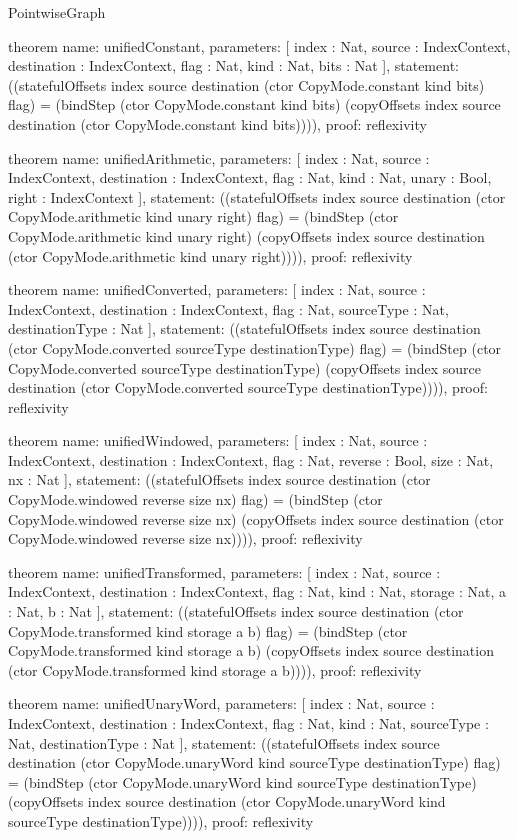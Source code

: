 \begin{lexlean}{PointwiseGraph}
\begin{semanticmodule}
theorem{
  name: unifiedConstant,
  parameters: [
    index : Nat,
    source : IndexContext,
    destination : IndexContext,
    flag : Nat,
    kind : Nat,
    bits : Nat
  ],
  statement: ((statefulOffsets index source destination (ctor CopyMode.constant kind bits) flag) = (bindStep (ctor CopyMode.constant kind bits) (copyOffsets index source destination (ctor CopyMode.constant kind bits)))),
  proof: reflexivity{}
}

theorem{
  name: unifiedArithmetic,
  parameters: [
    index : Nat,
    source : IndexContext,
    destination : IndexContext,
    flag : Nat,
    kind : Nat,
    unary : Bool,
    right : IndexContext
  ],
  statement: ((statefulOffsets index source destination (ctor CopyMode.arithmetic kind unary right) flag) = (bindStep (ctor CopyMode.arithmetic kind unary right) (copyOffsets index source destination (ctor CopyMode.arithmetic kind unary right)))),
  proof: reflexivity{}
}

theorem{
  name: unifiedConverted,
  parameters: [
    index : Nat,
    source : IndexContext,
    destination : IndexContext,
    flag : Nat,
    sourceType : Nat,
    destinationType : Nat
  ],
  statement: ((statefulOffsets index source destination (ctor CopyMode.converted sourceType destinationType) flag) = (bindStep (ctor CopyMode.converted sourceType destinationType) (copyOffsets index source destination (ctor CopyMode.converted sourceType destinationType)))),
  proof: reflexivity{}
}

theorem{
  name: unifiedWindowed,
  parameters: [
    index : Nat,
    source : IndexContext,
    destination : IndexContext,
    flag : Nat,
    reverse : Bool,
    size : Nat,
    nx : Nat
  ],
  statement: ((statefulOffsets index source destination (ctor CopyMode.windowed reverse size nx) flag) = (bindStep (ctor CopyMode.windowed reverse size nx) (copyOffsets index source destination (ctor CopyMode.windowed reverse size nx)))),
  proof: reflexivity{}
}

theorem{
  name: unifiedTransformed,
  parameters: [
    index : Nat,
    source : IndexContext,
    destination : IndexContext,
    flag : Nat,
    kind : Nat,
    storage : Nat,
    a : Nat,
    b : Nat
  ],
  statement: ((statefulOffsets index source destination (ctor CopyMode.transformed kind storage a b) flag) = (bindStep (ctor CopyMode.transformed kind storage a b) (copyOffsets index source destination (ctor CopyMode.transformed kind storage a b)))),
  proof: reflexivity{}
}

theorem{
  name: unifiedUnaryWord,
  parameters: [
    index : Nat,
    source : IndexContext,
    destination : IndexContext,
    flag : Nat,
    kind : Nat,
    sourceType : Nat,
    destinationType : Nat
  ],
  statement: ((statefulOffsets index source destination (ctor CopyMode.unaryWord kind sourceType destinationType) flag) = (bindStep (ctor CopyMode.unaryWord kind sourceType destinationType) (copyOffsets index source destination (ctor CopyMode.unaryWord kind sourceType destinationType)))),
  proof: reflexivity{}
}


\end{semanticmodule}
\end{lexlean}
